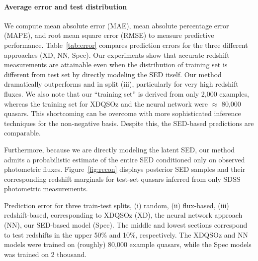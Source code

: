 \documentclass{article} %
\begin{document}
\paragraph{Average error and test distribution}
We compute mean absolute error (MAE), mean absolute percentage error (MAPE), and root mean square error (RMSE) to measure predictive performance.  
Table~\ref{tab:error} compares prediction errors for the three different approaches (XD, NN, Spec). %
Our experiments show that accurate redshift measurements are attainable even when the distribution of training set is different from test set by directly modeling the SED itself. Our method dramatically outperforms \cite{bovy2012photometric} and \cite{brescia2013photometric} in split (iii), particularly for very high redshift fluxes.  
We also note that our ``training set'' is derived from only 2,000 examples, whereas the training set for XDQSOz and the neural network were $\approx$ 80,000 quasars.  This shortcoming can be overcome with more sophisticated inference techniques for the non-negative basis.  Despite this, the SED-based predictions are comparable.
  
Furthermore, because we are directly modeling the latent SED, our method admits a probabilistic estimate of the entire SED conditioned only on observed photometric fluxes.
Figure~\ref{fig:recon} displays posterior SED samples and their corresponding redshift marginals for test-set quasars inferred from only SDSS photometric measurements.  


\begin{table}[t]
\caption{Prediction error for three train-test splits, (i) random, (ii) flux-based, (iii) redshift-based, corresponding to XDQSOz \cite{bovy2012photometric} (XD), the neural network approach \cite{brescia2013photometric} (NN), our SED-based model (Spec). The middle and lowest sections correspond to test redshifts in the upper 50\% and 10\%, respectively.  The XDQSOz and NN models were trained on (roughly) 80,000 example quasars, while the Spec models was trained on 2 thousand. }
\label{tab:error}
\begin{center}
\begin{small}

\end{small}
\end{center}
\end{table}
\end{document}
